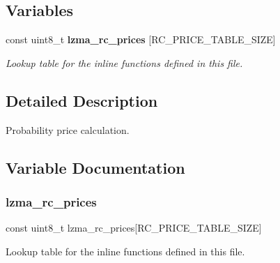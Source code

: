 \subsection*{Variables}
\begin{DoxyCompactItemize}
\item 
const uint8\+\_\+t \textbf{ lzma\+\_\+rc\+\_\+prices} [R\+C\+\_\+\+P\+R\+I\+C\+E\+\_\+\+T\+A\+B\+L\+E\+\_\+\+S\+I\+ZE]
\begin{DoxyCompactList}\small\item\em Lookup table for the inline functions defined in this file. \end{DoxyCompactList}\end{DoxyCompactItemize}


\subsection{Detailed Description}
Probability price calculation. 



\subsection{Variable Documentation}
\mbox{\label{price_8h_ab6ce95bec016604493ae528e847554aa}} 
\subsubsection{lzma\+\_\+rc\+\_\+prices}
{\footnotesize\ttfamily const uint8\+\_\+t lzma\+\_\+rc\+\_\+prices[R\+C\+\_\+\+P\+R\+I\+C\+E\+\_\+\+T\+A\+B\+L\+E\+\_\+\+S\+I\+ZE]}



Lookup table for the inline functions defined in this file. 

